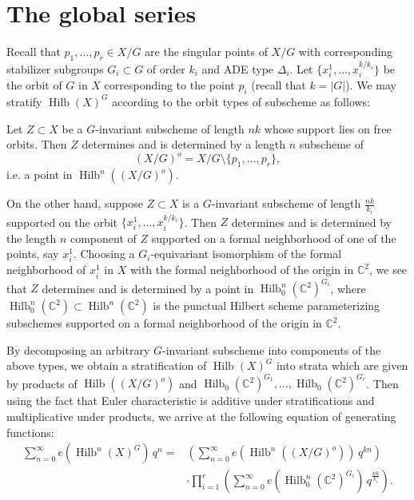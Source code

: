 \documentclass{article}
\theoremstyle{definition}
\newcommand{\CC} {{\mathbb C}}          %
\newcommand{\Hilb}{\operatorname{Hilb}}
\begin{document}
\section{The global series}\label{sec: the global series}

Recall that $p_{1},\dotsc ,p_{r}\in X/G$ are the singular points of
$X/G$ with corresponding stabilizer subgroups $G_{i}\subset G$ of
order $k_{i}$ and ADE type $\Delta_{i}$. Let $\{x_{i}^{1},\dotsc
,x_{i}^{k/k_{i}} \}$ be the orbit of $G$ in $X$ corresponding to the
point $p_{i}$ (recall that $k=|G|$).  We may stratify $\Hilb (X)^{G}$
according to the orbit types of subscheme as follows:

Let $Z\subset X$ be a $G$-invariant subscheme of length $nk$ whose
support lies on free orbits. Then $Z$ determines and is determined by
a length $n$ subscheme of 
\[
(X/G)^{o}  = X/G\setminus \{p_{1},\dotsc ,p_{r} \},
\]
i.e. a point
in $\Hilb^{n}((X/G)^{o})$.

On the other hand, suppose $Z\subset X$ is a $G$-invariant subscheme
of length $\frac{nk}{k_{i}}$ supported on the orbit
$\{x_{i}^{1},\dotsc ,x_{i}^{k/k_{i}} \}$. Then $Z$ determines and is
determined by the length $n$ component of $Z$ supported on a formal
neighborhood of one of the points, say $x_{i}^{1}$. Choosing a
$G_{i}$-equivariant isomorphism of the formal neighborhood of
$x_{i}^{1}$ in $X$ with the formal neighborhood of the origin in
$\CC^{2}$, we see that $Z$ determines and is determined by a point in
$\Hilb_{0}^{n}(\CC^{2})^{G_{i}}$, where $\Hilb_{0}^{n}(\CC^{2})\subset
\Hilb^{n}(\CC^{2})$ is the punctual Hilbert scheme parameterizing
subschemes supported on a formal neighborhood of the origin in
$\CC^{2}$.

By decomposing an arbitrary $G$-invariant subscheme into components of
the above types, we obtain a stratification of $\Hilb (X)^{G}$ into
strata which are given by products of $\Hilb ((X/G)^{o})$ and
$\Hilb_{0}(\CC^{2})^{G_{1}},\dotsc ,\Hilb_{0}(\CC^{2})^{G_{r}}$. Then
using the fact that Euler characteristic is additive under
stratifications and multiplicative under products, we arrive at the
following equation of generating functions:
\begin{align}\label{eqn: stratification formula for sum e(hilb(X)G)}
\nonumber\sum_{n=0}^{\infty} e\left(\Hilb^{n}(X)^{G} \right)\, q^{n}
=&\left(\sum_{n=0}^{\infty} e\left(\Hilb^{n}((X/G)^{o}) \right)\,
q^{kn} \right)\\
& \cdot \prod_{i=1}^{r}\left( \sum_{n=0}^{\infty}
e\left(\Hilb_{0}^{n}(\CC^{2})^{G_{i}} \right) \, q^{\frac{nk}{k_{i}}}
\right) .
\end{align}
\end{document}
